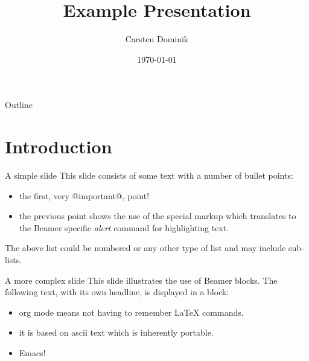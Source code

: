 \documentclass[aspectratio=169]{beamer}
\author{Carsten Dominik}
\date{\today}
\title{Example Presentation}
\institute{The Changelog}
\begin{document}
\maketitle
\begin{frame}{Outline}
\tableofcontents
\end{frame}



\section{Introduction}
\label{sec:org1ab49ba}
\begin{frame}[label={sec:org9ed4ed6}]{A simple slide}
This slide consists of some text with a number of bullet points:

\begin{itemize}
\item the first, very @important@, point!
\item the previous point shows the use of the special markup which
translates to the Beamer specific \emph{alert} command for highlighting
text.
\end{itemize}


The above list could be numbered or any other type of list and may
include sub-lists.
\end{frame}

\begin{frame}[label={sec:orge9a6451}]{A more complex slide}
This slide illustrates the use of Beamer blocks.  The following text,
with its own headline, is displayed in a block:

\begin{theorem}
\begin{itemize}
\item org mode means not having to remember \LaTeX{} commands.
\item it is based on ascii text which is inherently portable.
\item Emacs!
\end{itemize}
\end{theorem}
\end{frame}




\end{document}
